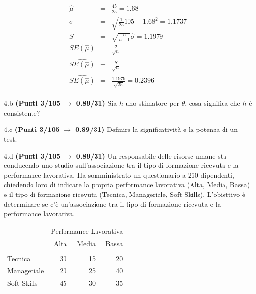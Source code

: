 \documentclass[
  11pt,
]{book}
\theoremstyle{mytheoremstyle}
\theoremstyle{mydefstyle}
\newenvironment{sol}
  {
  \begin{tcolorbox}[enhanced,breakable,arc=0.1mm,boxrule=1pt,colback=white,colframe=iblue,
  title=\bf \fontfamily{lmss}\selectfont \hspace{.5 cm} Soluzione,drop fuzzy shadow]

}{
\end{tcolorbox}
  }
\begin{document}
\begin{sol}
\begin{eqnarray*}
  \hat\mu  &=&\frac{45}{25}=1.68\\
  \hat\sigma &=&\sqrt{\frac 1{25}105-1.68^2}=1.1737\\
  S &=&\sqrt{\frac{n}{n-1}}\hat\sigma=1.1979\\
  SE(\hat\mu) &=&  \frac{\sigma}{\sqrt{n}}\\
  \widehat{SE(\hat\mu)} &=& \frac{S}{\sqrt{n}}\\
  \widehat{SE(\hat\mu)} &=& \frac{1.1979}{\sqrt{25}}=0.2396\\
\end{eqnarray*}

\end{sol}

4.b \textbf{(Punti 3/105 \(\rightarrow\) 0.89/31)} Sia \(h\) uno stimatore per \(\theta\), cosa significa che \(h\) è consistente?

4.c \textbf{(Punti 3/105 \(\rightarrow\) 0.89/31)} Definire la significatività e la potenza di un test.

4.d \textbf{(Punti 3/105 \(\rightarrow\) 0.89/31)} Un responsabile delle risorse umane sta conducendo uno studio sull'associazione tra il tipo di formazione ricevuta e la performance lavorativa. Ha somministrato un questionario a 260 dipendenti, chiedendo loro di indicare la propria performance lavorativa (Alta, Media, Bassa) e il tipo di formazione ricevuta (Tecnica, Manageriale, Soft Skills). L'obiettivo è determinare se c'è un'associazione tra il tipo di formazione ricevuta e la performance lavorativa.

\begin{table}[H]
\centering\centering\centering
\begin{tabular}{lrrr}
\toprule
\multicolumn{1}{c}{ } & \multicolumn{3}{c}{Performance Lavorativa} \\
\cmidrule(l{3pt}r{3pt}){2-4}
  & Alta & Media & Bassa\\
\midrule
\addlinespace[0.3em]
\multicolumn{4}{l}{\textbf{Tipo di Formazione}}\\
\hspace{1em}Tecnica & 30 & 15 & 20\\
\hspace{1em}Manageriale & 20 & 25 & 40\\
\hspace{1em}Soft Skills & 45 & 30 & 35\\
\bottomrule
\end{tabular}
\end{table}
\end{document}
